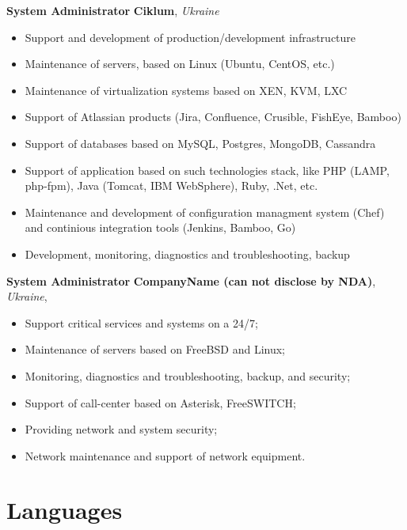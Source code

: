 \documentclass[11pt,a4paper,serif]{moderncv}
\begin{document}
		{\textbf{System Administrator}
		\newline\textbf{Ciklum}, \emph{Ukraine}
		\begin{itemize}
			\item Support and development of production/development infrastructure
			\item Maintenance of servers, based on Linux (Ubuntu, CentOS, etc.)
			\item Maintenance of virtualization systems based on XEN, KVM, LXC
			\item Support of Atlassian products (Jira, Confluence, Crusible, FishEye,
			Bamboo) 
			\item Support of databases based on MySQL, Postgres, MongoDB, Cassandra
			\item Support of application based on such technologies stack, like PHP
			(LAMP, php-fpm), Java (Tomcat, IBM WebSphere), Ruby, .Net, etc.
			\item Maintenance and development of configuration managment system (Chef) and
			continious integration tools (Jenkins, Bamboo, Go)
			\item Development, monitoring, diagnostics and troubleshooting, backup
		\end{itemize}
		}

		{\textbf{System Administrator}
		\newline\textbf{CompanyName (can not disclose by NDA)}, \emph{Ukraine},
		\begin{itemize}
		 	\item Support critical services and systems on a 24/7;
		 	\item Maintenance of servers based on FreeBSD and Linux;
		 	\item Monitoring, diagnostics and troubleshooting, backup, and security;
		 	\item Support of call-center based on Asterisk, FreeSWITCH;
		 	\item Providing network and system security;
			\item Network maintenance and support of network equipment.
		\end{itemize}}

\section{Languages}
\end{document}
